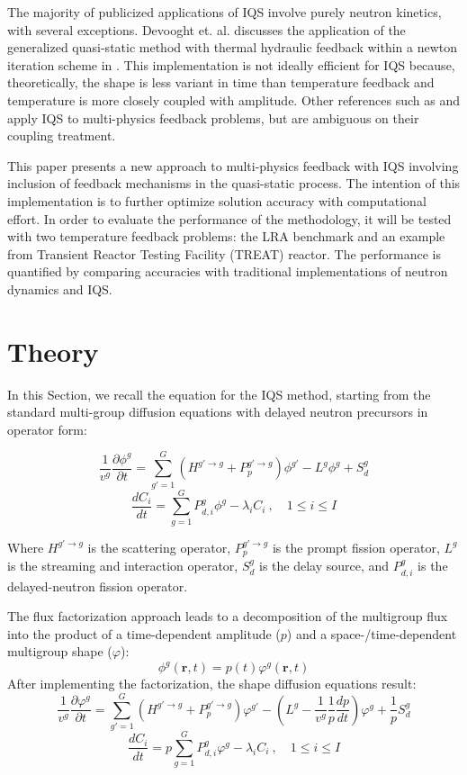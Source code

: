 \documentclass{anstrans}
\renewcommand{\vec}[1]{\bm{#1}} %
\newcommand{\be}{\begin{equation}}
\newcommand{\ee}{\end{equation}}
\begin{document}
The majority of publicized applications of IQS involve purely neutron kinetics, with several exceptions.  Devooght et. al. discusses the application of the generalized quasi-static method with thermal hydraulic feedback within a newton iteration scheme in \cite{Devooght_1984}. This implementation is not ideally efficient for IQS because, theoretically, the shape is less variant in time than temperature feedback and temperature is more closely coupled with amplitude.  Other references such as \cite{Banfield_2013} and \cite{KIKO3D_2003} apply IQS to multi-physics feedback problems, but are ambiguous on their coupling treatment.

This paper presents a new approach to multi-physics feedback with IQS involving inclusion of feedback mechanisms in the quasi-static process.  The intention of this implementation is to further optimize solution accuracy with computational effort.  In order to evaluate the performance of the methodology, it will be tested with two temperature feedback problems: the LRA benchmark and an example from Transient Reactor Testing Facility (TREAT) reactor.  The performance is quantified by comparing accuracies with traditional implementations of neutron dynamics and IQS.


\section{Theory}

In this Section, we recall the equation for the IQS method, starting from the standard multi-group diffusion equations with delayed neutron precursors in operator form:

\be
\frac{1}{v^g}\frac{\partial \phi^g}{\partial t} = \sum_{g'=1}^G \left(H^{g'\to g} + P_p^{g' \to g} \right) \phi^{g'} - L^g\phi^g + S_{d}^g
\label{eq:flux}
\ee 
\be
\frac{dC_i}{dt} = \sum_{g=1}^G P_{d,i}^g \phi^{g} - \lambda_i C_i \ , \quad 1 \le i \le I 
\label{eq:precursor}
\ee

Where $H^{g'\to g}$ is the scattering operator, $P_p^{g' \to g}$ is the prompt fission operator, $L^g$ is the streaming and interaction operator, 
$S_{d}^g$ is the delay source, and $P_{d,i}^g$ is the delayed-neutron fission operator.

The flux factorization approach leads to a decomposition of the multigroup flux into the product of a time-dependent amplitude ($p$) and a space-/time-dependent 
multigroup shape ($\varphi$):
\be
\phi^g(\vec{r},t)=p(t)\varphi^g(\vec{r},t)
\ee
After implementing the factorization, the shape diffusion equations result:
\be
\frac{1}{v^g}\frac{\partial \varphi^g}{\partial t} = \sum_{g'=1}^G \left(H^{g'\to g} + P_p^{g' \to g} \right) \varphi^{g'} - \left(L^g - \boxed{\frac{1}{v^g}\frac{1}{p}\frac{dp}{dt}}\right)\varphi^g + \boxed{\frac{1}{p}}S_{d}^g
\label{eq:shape}
\ee 
\be
\frac{dC_i}{dt} = \boxed{p}\sum_{g=1}^G P_{d,i}^g \varphi^{g} - \lambda_i C_i \ , \quad 1 \le i \le I 
\label{eq:prec}
\ee
\end{document}
